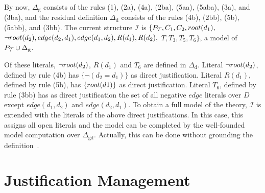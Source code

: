 \documentclass[11pt]{article}
\newcommand{\m}[1]{\ensuremath{#1}\xspace}
\newcommand{\I}{\m{\mathcal{I}}}
\newcommand{\theory}{\m{\mathcal{T}}}
\newcommand{\D}{\m{\Delta}}
\theoremstyle{plain}
\theoremstyle{definition}
\theoremstyle{example_basic}
\theoremstyle{example_contd}
\theoremstyle{plain}
\newcommand{\Dg}{\ensuremath{\D_\text{g}}\xspace}
\newcommand{\Dd}{\ensuremath{\D_\text{d}}\xspace}
\newcommand{\Dgd}{\ensuremath{\D_\text{gd}}\xspace}
\newcommand{\pt}{\ensuremath{P_\text{\theory}}\xspace}
\newcommand{\change}[1]{#1}
\begin{document}
By now, \Dg consists of the rules (1), (2a), (4a), (2ba), (5aa), (5aba), (3a), and (3ba), and the residual definition \Dd consists of the rules (4b), (2bb), (5b), (5abb), and (3bb). The current structure \I is $\{\pt, C_1, C_2, \rt(d_1), $  $\lnot root(d_2), edge(d_2,d_1), edge(d_1,d_2), R(d_1), R(d_2),$ $T, T_3, T_5, T_6 \}$, a model of $\pt \cup \Dg$. 

Of these literals, $\lnot root(d_2)$, $R(d_1)$ and $T_6$ are defined in \Dd. Literal $\lnot root(d_2)$, defined by rule (4b) has \change{$\{\neg (d_2=d_1)\}$} as direct justification.  Literal $R(d_1)$, defined by rule (5b), has $\{root(d1)\}$ as direct justification. Literal $T_6$, defined by rule (3bb) has as direct justification the set of all negative $edge$ literals over $D$ except $edge(d_1,d_2)$ and $edge(d_2,d_1)$. To obtain a full model of the theory, \I is extended with the literals of the above direct justifications. In this case, this assigns all open literals and the model can be completed by the well-founded model computation over \Dgd. Actually, this can be done without grounding the definition~\cite{tplp/Jansen13}.

\section{Justification Management}\label{sec:algorithms}

\newcommand{\buildconstr}{\textsf{build\_djust}\xspace}
\newcommand{\csplit}{\textsf{split}\xspace}
\newcommand{\lazyground}{\textsf{lazy\_ground}\xspace}
\newcommand{\lazymx}{\textsf{lazy\_mx}\xspace}

\newcommand{\dstate}{default acceptable state\xspace}

\newcommand{\propagate}{\textsf{propagate}\xspace}
\newcommand{\learnnogood}{\textsf{learn\_nogood}\xspace}
\newcommand{\checkliteral}{\textsf{check\_literal}\xspace}
\newcommand{\splitandground}{\textsf{split\_and\_ground}\xspace}
\newcommand{\construct}{\textsf{justify}\xspace}
\newcommand{\initjust}{\textsf{init\_just}\xspace}

\newcommand{\red}{\color{red}}
\newcommand{\blue}{\color{blue}}
\newcommand{\green}{\color{green}}
\newcommand{\gray}{\color{gray}}
\newcommand{\black}{\color{black}}

\end{document}
